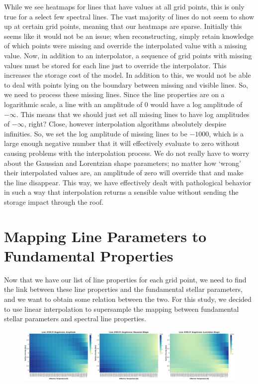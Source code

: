 \documentclass[twocolumn]{aastex631}
\begin{document}
While we see heatmaps for lines that have values at all grid points, this is only true for
a select few spectral lines. The vast majority of lines do not seem to show up at certain
grid points, meaning that our heatmaps are sparse. Initially this seems like it would not be an
issue; when reconstructing, simply retain knowledge of which points were missing and override
the interpolated value with a missing value. Now, in addition to an
interpolator, a sequence of grid points with missing values must be stored for each line just to
override the interpolator. This increases the storage cost of the model. In addition to this, we would
not be able to deal with points lying on the boundary between missing and visible lines. So, we need
to process these missing lines. Since the line properties are on a logarithmic scale,
a line with an amplitude of 0 would have a log amplitude of $-\infty$. This means that we should just
set all missing lines to have log amplitudes of $-\infty$, right? Close, however interpolation
algorithms absolutely despise infinities. So, we set the log amplitude of missing lines to be
$-1000$, which is a large enough negative number that it will effectively evaluate to zero without
causing problems with the interpolation process. We do not really have to worry about the Gaussian
and Lorentzian shape parameters; no matter how `wrong' their interpolated values are, an amplitude of
zero will override that and make the line disappear. This way, we have effectively dealt with
pathological behavior in such a way that interpolation returns a sensible value without sending
the storage impact through the roof.

\section{Mapping Line Parameters to Fundamental Properties}

Now that we have our list of line properties for each grid point, we need to find the link 
between these line properties and the fundamental stellar parameters, and we want to obtain
some relation between the two. For this study, we decided to use linear interpolation to
supersample the mapping between fundamental stellar parameters and spectral line properties.

\begin{figure}
    \includegraphics[width=\textwidth]{images/heatmap_poly.png}
\end{figure}
\end{document}
